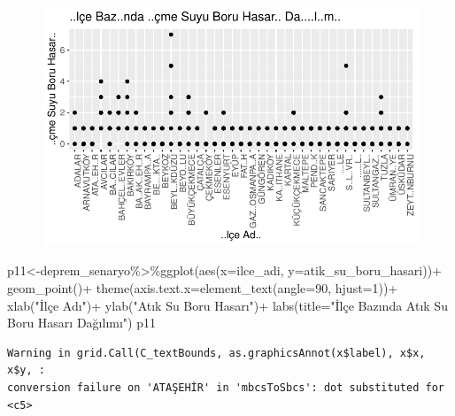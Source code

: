 \documentclass[
  11pt,
  a4paper,
  DIV=11,
  numbers=noendperiod]{scrartcl}
\newenvironment{Shaded}{\begin{snugshade}}{\end{snugshade}}
\newcommand{\AttributeTok}[1]{\textcolor[rgb]{0.40,0.45,0.13}{#1}}
\newcommand{\DecValTok}[1]{\textcolor[rgb]{0.68,0.00,0.00}{#1}}
\newcommand{\FunctionTok}[1]{\textcolor[rgb]{0.28,0.35,0.67}{#1}}
\newcommand{\NormalTok}[1]{\textcolor[rgb]{0.00,0.23,0.31}{#1}}
\newcommand{\OtherTok}[1]{\textcolor[rgb]{0.00,0.23,0.31}{#1}}
\newcommand{\SpecialCharTok}[1]{\textcolor[rgb]{0.37,0.37,0.37}{#1}}
\newcommand{\StringTok}[1]{\textcolor[rgb]{0.13,0.47,0.30}{#1}}
\begin{document}
\begin{figure}[H]

{\centering \includegraphics{project_files/figure-pdf/unnamed-chunk-5-2.pdf}

}

\end{figure}

\begin{Shaded}
\begin{Highlighting}[]
\NormalTok{p11}\OtherTok{\textless{}{-}}\NormalTok{deprem\_senaryo}\SpecialCharTok{\%\textgreater{}\%}\FunctionTok{ggplot}\NormalTok{(}\FunctionTok{aes}\NormalTok{(}\AttributeTok{x=}\NormalTok{ilce\_adi, }\AttributeTok{y=}\NormalTok{atik\_su\_boru\_hasari))}\SpecialCharTok{+}
  \FunctionTok{geom\_point}\NormalTok{()}\SpecialCharTok{+}
  \FunctionTok{theme}\NormalTok{(}\AttributeTok{axis.text.x=}\FunctionTok{element\_text}\NormalTok{(}\AttributeTok{angle=}\DecValTok{90}\NormalTok{, }\AttributeTok{hjust=}\DecValTok{1}\NormalTok{))}\SpecialCharTok{+}
  \FunctionTok{xlab}\NormalTok{(}\StringTok{"İlçe Adı"}\NormalTok{)}\SpecialCharTok{+}
  \FunctionTok{ylab}\NormalTok{(}\StringTok{"Atık Su Boru Hasarı"}\NormalTok{)}\SpecialCharTok{+}
  \FunctionTok{labs}\NormalTok{(}\AttributeTok{title=}\StringTok{"İlçe Bazında Atık Su Boru Hasarı Dağılımı"}\NormalTok{)}
\NormalTok{p11}
\end{Highlighting}
\end{Shaded}

\begin{verbatim}
Warning in grid.Call(C_textBounds, as.graphicsAnnot(x$label), x$x, x$y, :
conversion failure on 'ATAŞEHİR' in 'mbcsToSbcs': dot substituted for <c5>
\end{verbatim}
\end{document}
